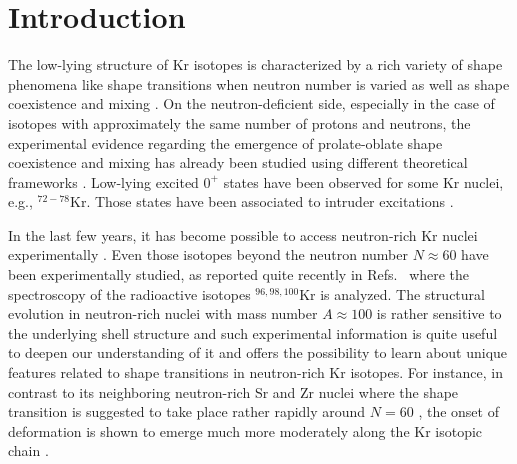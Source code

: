\documentclass[twocolumn,showpacs,amsmath,amssymb,superscriptaddress]{revtex4-1}
\begin{document}

\section{Introduction}



The low-lying structure of Kr isotopes is characterized by a rich 
variety of shape phenomena like shape transitions when neutron number 
is varied \cite{CasBook,cejnar2010} as well as shape coexistence and 
mixing \cite{heyde2011}. On the neutron-deficient side, especially in 
the case of isotopes  with approximately the same number of  protons 
and neutrons, the experimental evidence \cite{clement2007} regarding 
the emergence of prolate-oblate shape coexistence and mixing has 
already been studied using different theoretical frameworks 
\cite{bender2006,clement2007,fu2013,trodriguez2014,PETROVICI2000,SATO2011}. Low-lying excited 
$0^+$ states have been observed for some Kr nuclei, e.g., $^{72-78}$Kr. 
Those states have been associated to  intruder excitations 
\cite{heyde2011}. 


In the last few years, it has become possible to access neutron-rich Kr 
nuclei experimentally 
\cite{naimi2010,albers2012,albers2013,rzkacaurban2017,dudouet2017,flavigny2017}. 
Even those isotopes beyond the neutron number $N\approx 60$ have been 
experimentally studied, as reported quite recently in 
Refs.~\cite{dudouet2017,flavigny2017} where  the spectroscopy of the 
radioactive isotopes $^{96,98,100}$Kr is analyzed. The structural 
evolution in  neutron-rich nuclei with mass number $A\approx 100$ is 
rather sensitive to the underlying shell structure and such 
experimental information is quite useful to deepen our understanding of 
it and offers the possibility to learn about unique features related to 
shape transitions in neutron-rich Kr isotopes. For instance, in 
contrast to its neighboring neutron-rich Sr and Zr nuclei where the 
shape transition is suggested to take place rather rapidly around 
$N=60$ \cite{togashi2016,kremer2016,clement2017}, the onset of 
deformation is shown to emerge much more moderately  along the Kr 
isotopic chain \cite{albers2012,albers2013,dudouet2017}. 
\end{document}
